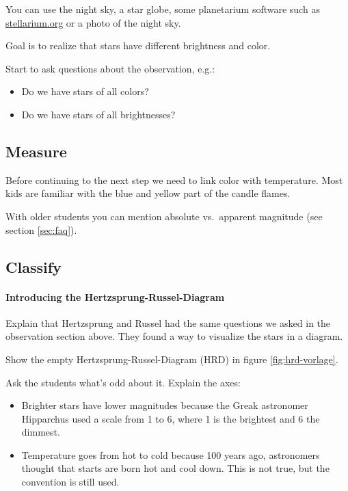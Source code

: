 \documentclass[a4paper]{article}
\begin{document}
    You can use the night sky, a star globe, some planetarium software such as \url{stellarium.org} or a photo of the night sky.
    
    Goal is to realize that stars have different brightness and color.

    Start to ask questions about the observation, e.g.:
	\begin{itemize}
		\item Do we have stars of all colors?
		\item Do we have stars of all brightnesses?
	\end{itemize}

    \subsection*{Measure}
    
	Before continuing to the next step we need to link color with temperature.
    Most kids are familiar with the blue and yellow part of the candle flames.
    
    With older students you can mention absolute vs.\ apparent magnitude (see section \ref{sec:faq}).

    \subsection*{Classify}

    \paragraph*{Introducing the Hertzsprung-Russel-Diagram}

    Explain that Hertzsprung and Russel had the same questions we asked in the observation section above.
    They found a way to visualize the stars in a diagram.

    Show the empty Hertzsprung-Russel-Diagram (HRD) in figure \ref{fig:hrd-vorlage}.

    Ask the students what's odd about it.
    Explain the axes:
    \begin{itemize}
        \item Brighter stars have lower magnitudes because the Greak astronomer Hipparchus used a scale from 1 to 6,
            where 1 is the brightest and 6 the dimmest.
        \item Temperature goes from hot to cold because 100 years ago, astronomers thought that starts are born hot
            and cool down. This is not true, but the convention is still used.
    \end{itemize}
\end{document}
